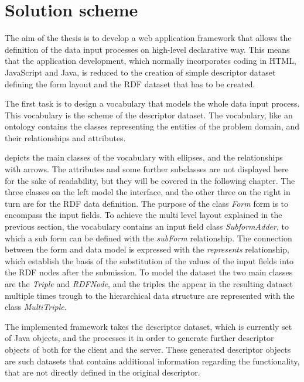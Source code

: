 \section{Solution scheme}

The aim of the thesis is to develop a web application framework that allows the definition of the data input processes on high-level declarative way. This means that the application development, which normally incorporates coding in HTML, JavaScript and Java, is reduced to the creation of simple descriptor dataset defining the form layout and the RDF dataset that has to be created.

The first task is to design a vocabulary that models the whole data input process. This vocabulary is the scheme of the descriptor dataset. The vocabulary, like an ontology contains the classes representing the entities of the problem domain, and their relationships and attributes.


 depicts the main classes of the vocabulary with ellipses, and the relationships with arrows. The attributes and some further subclasses are not displayed here for the sake of readability, but they will be covered in the following chapter. The three classes on the left model the interface, and the other three on the right in turn are for the RDF data definition. The purpose of the class \textit{Form} form is to encompass the input fields. To achieve the multi level layout explained in the previous section, the vocabulary contains an input field class \textit{SubformAdder}, to which a sub form can be defined with the \textit{subForm} relationship. The connection between the form and data model is expressed with the \textit{represents} relationship, which establish the basis of the substitution of the values of the input fields into the RDF nodes after the submission. To model the dataset the two main classes are the \textit{Triple} and \textit{RDFNode}, and the triples the appear in the resulting dataset multiple times trough to the hierarchical data structure are represented with the class \textit{MultiTriple}. 

The implemented framework takes the descriptor dataset, which is currently set of Java objects, and the processes it in order to generate further descriptor objects of both for the client and the server. These generated descriptor objects are such datasets that contains additional information regarding the functionality, that are not directly defined in the original descriptor. 

